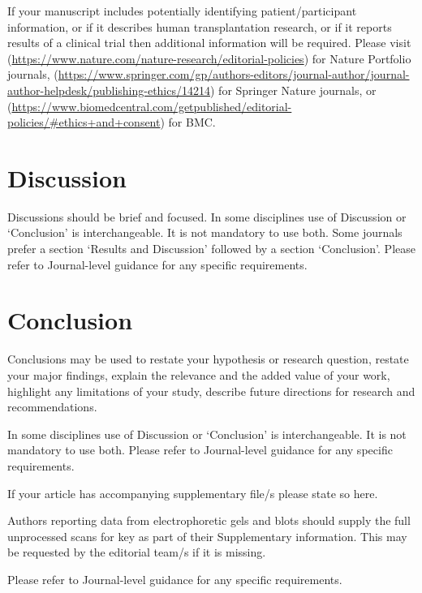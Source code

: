 \documentclass[sn-basic,lineno,pdflatex]{sn-jnl}
\theoremstyle{remark}
\theoremstyle{definition}
\begin{document}
If your manuscript includes potentially identifying patient/participant
information, or if it describes human transplantation research, or if it
reports results of a clinical trial then additional information will be
required. Please visit
(\url{https://www.nature.com/nature-research/editorial-policies}) for
Nature Portfolio journals,
(\url{https://www.springer.com/gp/authors-editors/journal-author/journal-author-helpdesk/publishing-ethics/14214})
for Springer Nature journals, or
(\url{https://www.biomedcentral.com/getpublished/editorial-policies/\#ethics+and+consent})
for BMC.

\section{Discussion}\label{sec12}

Discussions should be brief and focused. In some disciplines use of
Discussion or `Conclusion' is interchangeable. It is not mandatory to
use both. Some journals prefer a section `Results and Discussion'
followed by a section `Conclusion'. Please refer to Journal-level
guidance for any specific requirements.

\section{Conclusion}\label{sec13}

Conclusions may be used to restate your hypothesis or research question,
restate your major findings, explain the relevance and the added value
of your work, highlight any limitations of your study, describe future
directions for research and recommendations.

In some disciplines use of Discussion or `Conclusion' is
interchangeable. It is not mandatory to use both. Please refer to
Journal-level guidance for any specific requirements.

\backmatter


If your article has accompanying supplementary file/s please state so
here.

Authors reporting data from electrophoretic gels and blots should supply
the full unprocessed scans for key as part of their Supplementary
information. This may be requested by the editorial team/s if it is
missing.

Please refer to Journal-level guidance for any specific requirements.

\end{document}
